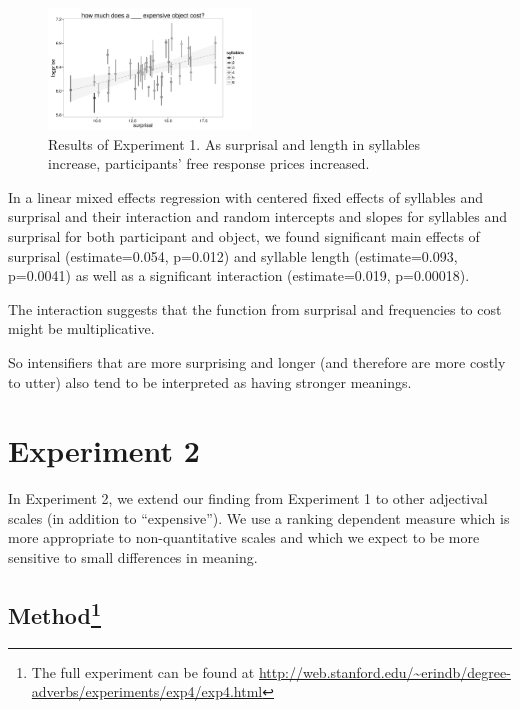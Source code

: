\documentclass[10pt,letterpaper]{article}
\begin{document}
\begin{figure}[ht]
\begin{center}
\includegraphics[width=0.48\textwidth]{analysis_files_for_writeup/images/exp1-plot.png}
\end{center}
\caption{Results of Experiment 1. As surprisal and length in syllables increase, participants' free response prices increased.} 
\label{exp1-plot}
\end{figure}

In a linear mixed effects regression with centered fixed effects of syllables and surprisal and their interaction and random intercepts and slopes for syllables and surprisal for both participant and object, we found significant main effects of surprisal (estimate=0.054, p=0.012) and syllable length  (estimate=0.093, p=0.0041) as well as a significant interaction (estimate=0.019, p=0.00018).

The interaction suggests that the function from surprisal and frequencies to cost might be multiplicative.

So intensifiers that are more surprising and longer (and therefore are more costly to utter) also tend to be interpreted as having stronger meanings.


\section{Experiment 2}

In Experiment 2, we extend our finding from Experiment 1 to other adjectival scales (in addition to ``expensive''). We use a ranking dependent measure which is more appropriate to non-quantitative scales and which we expect to be more sensitive to small differences in meaning.

\subsection{Method\footnote{The full experiment can be found at \url{http://web.stanford.edu/~erindb/degree-adverbs/experiments/exp4/exp4.html}}}
\end{document}
